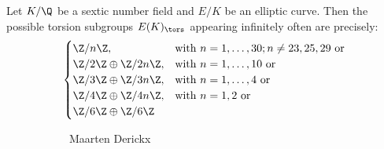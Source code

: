 \begin{frame}[plain]
\begin{thm}
Let $K/\Q$ be a sextic number field and $E/K$ be an elliptic curve. Then the possible torsion subgroups $E(K)_\tors$ appearing infinitely often are precisely:
	\[
	\begin{cases}
	\Z/n\Z, &  \text{with } n=1,\ldots,30; n \neq 23,25,29 \text{ or} \\
	\Z/2\Z \oplus \Z/2n\Z, & \text{with } n=1,\ldots,10 \text{ or} \\
	\Z/3\Z \oplus \Z/3n\Z, & \text{with } n=1,\ldots,4 \text{ or} \\
	\Z/4\Z \oplus \Z/4n\Z, & \text{with } n=1,2 \text{ or} \\
	\Z/6\Z \oplus \Z/6\Z 
	\end{cases}
	\]
\end{thm}
	\begin{figure}[h]
	\centering
	\begin{subfigure}{0.28\textwidth}
	\captionsetup{labelformat=empty}
	\centering
	\caption{\hspace{0.1cm}Maarten Derickx}
	\end{subfigure}
	\begin{subfigure}{0.28\textwidth}
	\captionsetup{labelformat=empty}
	\centering

\end{subfigure}
\end{figure}
\end{frame}
